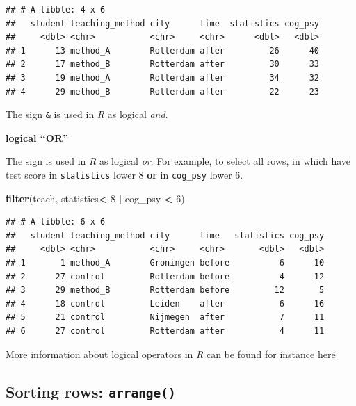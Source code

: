 \documentclass[
]{scrartcl}
\newenvironment{Shaded}{\begin{snugshade}}{\end{snugshade}}
\newcommand{\DecValTok}[1]{\textcolor[rgb]{0.00,0.00,0.81}{#1}}
\newcommand{\FunctionTok}[1]{\textcolor[rgb]{0.13,0.29,0.53}{\textbf{#1}}}
\newcommand{\NormalTok}[1]{#1}
\newcommand{\SpecialCharTok}[1]{\textcolor[rgb]{0.81,0.36,0.00}{\textbf{#1}}}
\begin{document}
\begin{verbatim}
## # A tibble: 4 x 6
##   student teaching_method city      time  statistics cog_psy
##     <dbl> <chr>           <chr>     <chr>      <dbl>   <dbl>
## 1      13 method_A        Rotterdam after         26      40
## 2      17 method_B        Rotterdam after         30      33
## 3      19 method_A        Rotterdam after         34      32
## 4      29 method_B        Rotterdam after         22      23
\end{verbatim}

The sign \texttt{\&} is used in \emph{R} as logical \emph{and}.

\textbf{logical ``OR''}

The sign \texttt{\textbar{}} is used in \emph{R} as logical \emph{or}. For example, to select all rows, in which have test score in \texttt{statistics} lower 8 \textbf{or} in \texttt{cog\_psy} lower 6.

\begin{Shaded}
\begin{Highlighting}[]
\FunctionTok{filter}\NormalTok{(teach, statistics}\SpecialCharTok{\textless{}} \DecValTok{8} \SpecialCharTok{|}\NormalTok{ cog\_psy }\SpecialCharTok{\textless{}} \DecValTok{6}\NormalTok{)}
\end{Highlighting}
\end{Shaded}

\begin{verbatim}
## # A tibble: 6 x 6
##   student teaching_method city      time   statistics cog_psy
##     <dbl> <chr>           <chr>     <chr>       <dbl>   <dbl>
## 1       1 method_A        Groningen before          6      10
## 2      27 control         Rotterdam before          4      12
## 3      29 method_B        Rotterdam before         12       5
## 4      18 control         Leiden    after           6      16
## 5      21 control         Nijmegen  after           7      11
## 6      27 control         Rotterdam after           4      11
\end{verbatim}

More information about logical operators in \emph{R} can be found for instance \href{https://r4ds.had.co.nz/transform.html\#logical-operators}{here}

\subsection{\texorpdfstring{Sorting rows: \texttt{arrange()}}{Sorting rows: arrange()}}\label{sorting-rows-arrange}
\end{document}
